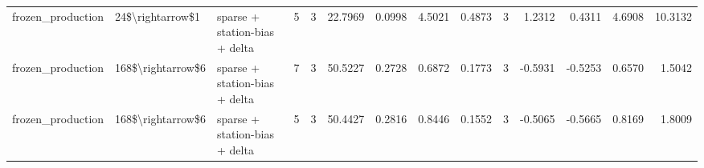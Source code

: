 \begin{table}
\begin{tabular}{llllrrrrrrrrrr}
frozen\_production & 24\$\textbackslash rightarrow\$1 & sparse + station-bias + delta & 5 & 3 & 22.7969 & 0.0998 & 4.5021 & 0.4873 & 3 & 1.2312 & 0.4311 & 4.6908 & 10.3132 \\
frozen\_production & 168\$\textbackslash rightarrow\$6 & sparse + station-bias + delta & 7 & 3 & 50.5227 & 0.2728 & 0.6872 & 0.1773 & 3 & -0.5931 & -0.5253 & 0.6570 & 1.5042 \\
frozen\_production & 168\$\textbackslash rightarrow\$6 & sparse + station-bias + delta & 5 & 3 & 50.4427 & 0.2816 & 0.8446 & 0.1552 & 3 & -0.5065 & -0.5665 & 0.8169 & 1.8009 \\
\bottomrule
\end{tabular}
\end{table}
